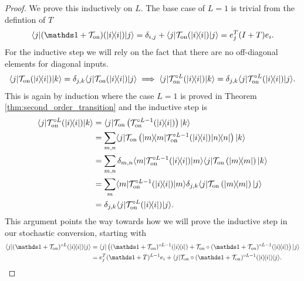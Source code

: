 \begin{proof}
    We prove this inductively on $L$. The base case of $L = 1$ is trivial from the defintion of $T$
    \begin{align}
    \bra{j} (\identity + \mathcal{T}_{\on})(\ketbra{i}{i}) \ket{j} = \delta_{i,j} + \bra{j} \mathcal{T}_{\on}(\ketbra{i}{i}) \ket{j} = e_j^T (I +  T) e_i.
\end{align}
For the inductive step we will rely on the fact that there are no off-diagonal elements for diagonal inputs. 
\begin{align}
    \langle j| \mathcal{T}_{\rm on} (| i\rangle\! \langle i|) |k\rangle = \delta_{j,k} \langle j| \mathcal{T}_{\rm on} (| i\rangle\! \langle i|) |j\rangle \implies \langle j| \mathcal{T}_{\rm on}^{\circ L} (| i\rangle\! \langle i|) |k\rangle = \delta_{j,k} \langle j| \mathcal{T}_{\rm on}^{\circ L} (| i\rangle\! \langle i|) |j\rangle.
\end{align}
This is again by induction where the case $L = 1$ is proved in Theorem \ref{thm:second_order_transition} and the inductive step is 
\begin{align}
    \bra{j} \mathcal{T}_{\on}^{\circ L} (\ketbra{i}{i}) \ket{k} &= \bra{j} \mathcal{T}_{\on} \left( \mathcal{T}_{\on}^{\circ L - 1} (\ketbra{i}{i}) \right) \ket{k} \\
    &= \sum_{m, n} \bra{j} \mathcal{T}_{\on}\left( \ketbra{m}{m}\mathcal{T}_{\on}^{\circ L - 1}(\ketbra{i}{i}) \ketbra{n}{n}\right) \ket{k} \\
    &= \sum_{m, n} \delta_{m,n} \bra{m}\mathcal{T}_{\on}^{\circ L - 1}(\ketbra{i}{i}) \ket{m} \bra{j} \mathcal{T}_{\on}\left(   \ketbra{m}{m} \right) \ket{k} \\
    &= \sum_{m} \bra{m}\mathcal{T}_{\on}^{\circ L - 1}(\ketbra{i}{i}) \ket{m} \delta_{j,k} \bra{j} \mathcal{T}_{\on}\left(   \ketbra{m}{m} \right) \ket{j} \\
    &= \delta_{j,k} \bra{j} \mathcal{T}_{\on}^{\circ L} (\ketbra{i}{i}) \ket{j}.
\end{align} 
This argument points the way towards how we will prove the inductive step in our stochastic conversion, starting with
\begin{align}
    \bra{j} (\identity + \mathcal{T}_{\on})^{\circ L}(\ketbra{i}{i}) \ket{j} &= \bra{j} \left( (\identity + \mathcal{T}_{\on})^{\circ L - 1} (\ketbra{i}{i}) + \mathcal{T}_{\on} \circ (\identity + \mathcal{T}_{\on})^{\circ L - 1} (\ketbra{i}{i}) \right)\ket{j} \\
    &= e_j^T (\identity + T)^{L - 1} e_i + \bra{j} \mathcal{T}_{\on} \circ (\identity + \mathcal{T}_{\on})^{\circ L - 1} (\ketbra{i}{i}) \ket{j} . \label{eq:matrix_reloaded1}

\end{align}
\end{proof}
